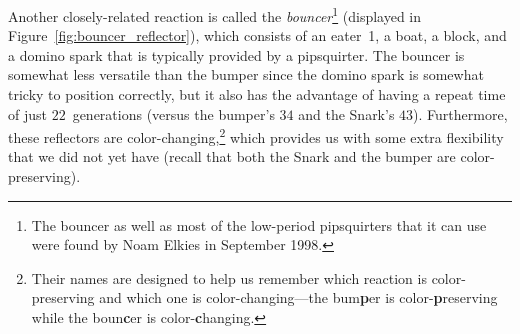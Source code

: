Another closely-related reaction is called the \emph{bouncer}\footnote{The bouncer as well as most of the low-period pipsquirters that it can use were found by Noam Elkies in September 1998.} (displayed in Figure~\ref{fig:bouncer_reflector}), which consists of an eater~1, a boat, a block, and a domino spark that is typically provided by a pipsquirter. The bouncer is somewhat less versatile than the bumper since the domino spark is somewhat tricky to position correctly, but it also has the advantage of having a repeat time of just $22$~generations (versus the bumper's $34$ and the Snark's $43$). Furthermore, these reflectors are color-changing,\footnote{Their names are designed to help us remember which reaction is color-preserving and which one is color-changing---the bum\textbf{p}er is color-\textbf{p}reserving while the boun\textbf{c}er is color-\textbf{c}hanging.} which provides us with some extra flexibility that we did not yet have (recall that both the Snark and the bumper are color-preserving).

